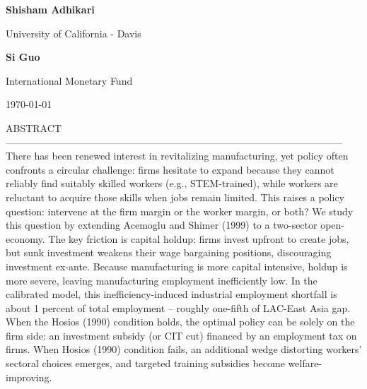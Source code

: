 \documentclass[12pt]{article} %
\theoremstyle{definition}
\begin{document}



\vspace{0.6cm}

\noindent \normalsize  \textbf{Shisham Adhikari} 

\noindent University of California - Davis

\noindent \normalsize  \textbf{Si Guo} 

\noindent International Monetary Fund 

\vspace{0.5cm}

\noindent  \today



\vspace{0.7cm}

\vspace{0.7cm}

\normalsize

\noindent ABSTRACT------------------------------------------------------------------------------------------------------
\noindent \noindent \noindent \noindent There has been renewed interest in revitalizing manufacturing, yet policy often confronts a circular challenge: firms hesitate to expand because they cannot reliably find suitably skilled workers (e.g., STEM-trained), while workers are reluctant to acquire those skills when jobs remain limited. This raises a policy question: intervene at the firm margin or the worker margin, or both?  We study this question by extending Acemoglu and Shimer (1999) to a two-sector open-economy. The key friction is capital holdup: firms invest upfront to create jobs, but sunk investment weakens their wage bargaining positions, discouraging investment ex-ante. Because manufacturing is more capital intensive, holdup is more severe, leaving manufacturing employment inefficiently low. In the calibrated model, this inefficiency-induced industrial employment shortfall is about 1 percent of total employment -- roughly one-fifth of LAC-East Asia gap. When the Hosios (1990) condition holds, the optimal policy can be solely on the firm side: an investment subsidy (or CIT cut) financed by an employment tax on firms. When Hosios (1990) condition fails, an additional wedge distorting workers’ sectoral choices emerges, and targeted training subsidies become welfare-improving.
\vspace{0.4cm}
\end{document}
